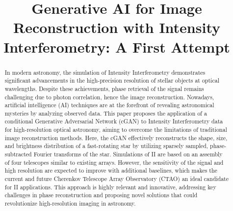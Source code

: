 \documentclass[fleqn,usenatbib,twocolumn]{mnras}
\title{Generative AI for Image Reconstruction with Intensity Interferometry: A First Attempt}
\date{}
\begin{document}
\maketitle

\begin{abstract}
In modern astronomy, the simulation of Intensity Interferometry demonstrates significant advancements in the high-precision resolution of stellar objects at optical wavelengths. Despite these achievements, phase retrieval of the signal remains challenging due to photon correlation, hence the image reconstruction. Nowadays, artificial intelligence (AI) techniques are at the forefront of revealing astronomical mysteries by analyzing observed data. This paper proposes the application of a conditional Generative Adversarial Network (cGAN) to Intensity Interferometry data for high-resolution optical astronomy, aiming to overcome the limitations of traditional image reconstruction methods. Here, the cGAN effectively reconstructs the shape, size, and brightness distribution of a fast-rotating star by utilizing sparsely sampled, phase-subtracted Fourier transforms of the star. Simulations of II are based on an assembly of four telescopes similar to existing arrays. However, the sensitivity of the signal and high resolution are expected to improve with additional baselines, which makes the current and future Cherenkov Telescope Array Observatory (CTAO) an ideal candidate for II applications. This approach is highly relevant and innovative, addressing key challenges in phase reconstruction and proposing novel solutions that could revolutionize high-resolution imaging in astronomy.	
\end{abstract}









\end{document}
